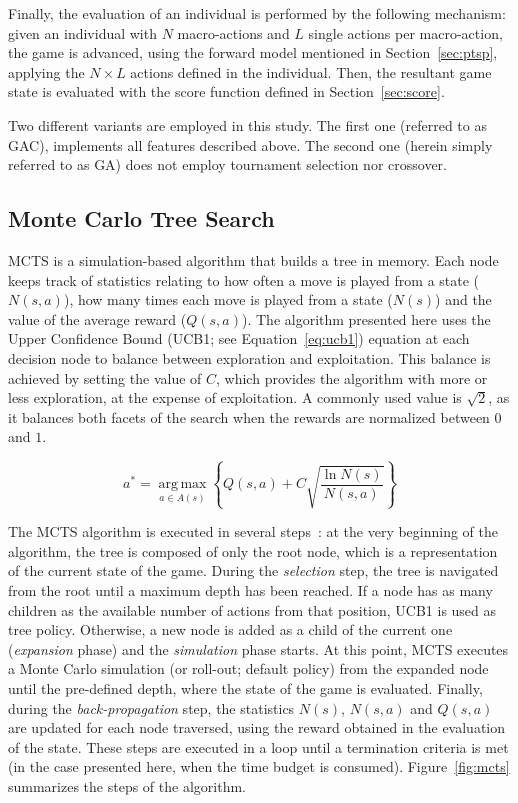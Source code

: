 \documentclass{sig-alternate}
\newcommand{\argmax}{\operatorname*{arg\,max}}
\begin{document}
Finally, the evaluation of an individual is performed by the following mechanism: given an individual with $N$ macro-actions and $L$ single actions per macro-action, the game is advanced, using the forward model mentioned in Section~\ref{sec:ptsp}, applying the $N \times L$ actions defined in the individual. Then, the resultant game state is evaluated with the score function defined in Section~\ref{sec:score}.

Two different variants are employed in this study. The first one (referred to as GAC), implements all features described above. The second one (herein simply referred to as GA) does not employ tournament selection nor crossover. 


\subsection{Monte Carlo Tree Search} \label{sec:uct}

MCTS is a simulation-based algorithm that builds a tree in memory. Each node keeps track of statistics relating to how often a move is played from a state ($N(s,a)$), how many times each move is played from a state ($N(s)$) and the value of the average reward ($Q(s,a)$). The algorithm presented here uses the Upper Confidence Bound (UCB1; see Equation~\ref{eq:ucb1}) equation at each decision node to balance between exploration and exploitation. This balance is achieved by setting the value of $C$, which provides the algorithm with more or less exploration, at the expense of exploitation. A commonly used value is $\sqrt{2}$, as it balances both facets of the search when the rewards are normalized between $0$ and $1$.

\begin{equation}	\label{eq:ucb1}
a^* = \argmax_{a \in A(s)} \left\{Q(s,a) + C \sqrt{\frac{ \ln N(s) }{ N(s,a) }}\right\}
\end{equation}
 

The MCTS algorithm is executed in several steps~\cite{Gelly2006a}: at the very beginning of the algorithm, the tree is composed of only the root node, which is a representation of the current state of the game. During the \textit{selection} step, the tree is navigated from the root until a maximum depth has been reached. If a node has as many children as the available number of actions from that position, UCB1 is used as tree policy. Otherwise, a new node is added as a child of the current one (\textit{expansion} phase) and the \textit{simulation} phase starts. At this point, MCTS executes a Monte Carlo simulation (or roll-out; default policy) from the expanded node until the pre-defined depth, where the state of the game is evaluated. Finally, during the \textit{back-propagation} step, the statistics $N(s)$, $N(s,a)$ and $Q(s,a)$ are updated for each node traversed, using the reward obtained in the evaluation of the state. These steps are executed in a loop until a termination criteria is met (in the case presented here, when the time budget is consumed). Figure~\ref{fig:mcts} summarizes the steps of the algorithm.
\end{document}
